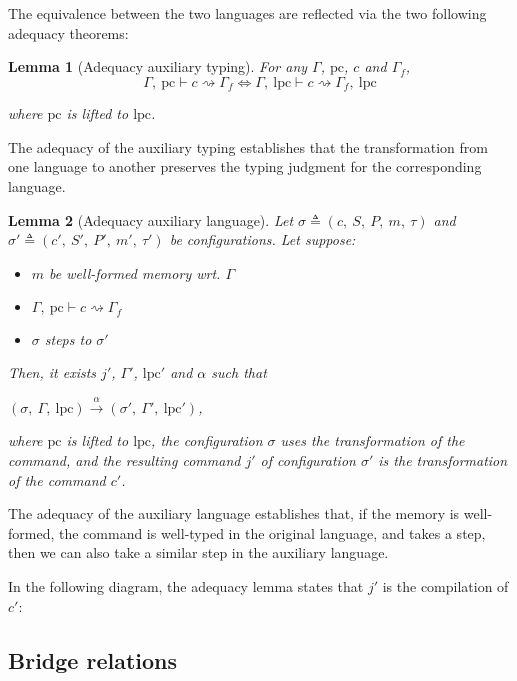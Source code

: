 \documentclass[10pt]{article}
\newcommand{\pc}{\mathrm{pc}}
\newcommand{\lpc}{\mathrm{lpc}}
\newcommand{\ctx}{\Gamma}
\newcommand{\conf}{\sigma}
\newcommand{\typing}[4]{ #1,~#2 \vdash #3 \rightsquigarrow #4}
\newcommand{\typingaux}[5]{ #1,~#2 \vdash #3 \rightsquigarrow #4,~#5}
\newcommand{\execaux}[7] { (#1,~#2,~#3) \xrightarrow{#4} (#5,~#6,~#7) }
\newtheorem{lemma}{Lemma}
\begin{document}
The equivalence between the two languages are reflected via the two following adequacy theorems:

\begin{lemma}[Adequacy auxiliary typing]
  For any $\ctx$, $\pc$, $c$ and $\ctx_{f}$,
  \[
  \typing{\ctx}{\pc}{c}{\ctx_{f}}
  \Leftrightarrow
    \typingaux{\ctx}{\lpc}{c}{\ctx_{f}}{\lpc}
  \]

  where $\pc$ is lifted to $\lpc$.
\end{lemma}

The adequacy of the auxiliary typing establishes that the transformation from one language to
another preserves the typing judgment for the corresponding language.

\begin{lemma}[Adequacy auxiliary language]
  Let $\conf \triangleq (c,~S,~P,~m,~\tau)$ and
  $\conf' \triangleq (c',~S',~P',~m',~\tau')$ be configurations.
  Let suppose:
  \begin{itemize}
    \item $m$ be well-formed memory wrt. $\ctx$
    \item $\typing{\ctx}{\pc}{c}{\ctx_{f}}$
    \item $\conf$ steps to $\conf'$
  \end{itemize}

  Then, it exists $j'$, $\ctx'$, $\lpc'$ and $\alpha$ such that

  \( \execaux{\conf}{\ctx}{\lpc}{\alpha}{\conf'}{\ctx'}{\lpc'} \),

  where $\pc$ is lifted to $\lpc$, the configuration $\conf$ uses the transformation of the command,
  and the resulting command $j'$ of configuration $\conf'$ is the transformation of the command $c'$.
\end{lemma}

The adequacy of the auxiliary language establishes that, if the memory is well-formed, the
command is well-typed in the original language, and takes a step, then we can also take a similar
step in the auxiliary language.

In the following diagram, the adequacy lemma states that $j'$ is the compilation of $c'$:


\subsection{Bridge relations}%
\label{subsec:brigde_rel}
\end{document}
